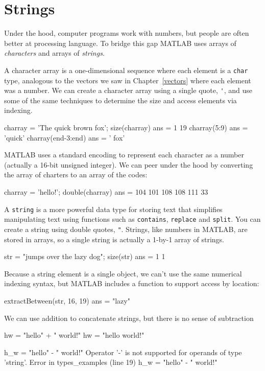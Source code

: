 \section{Strings}

Under the hood, computer programs work with numbers, but people are often better at processing language.  To bridge this gap MATLAB uses arrays of \emph{characters} and arrays of \emph{strings}.

A character array is a one-dimensional sequence where each element is a \lstinline{char} type, analogous to the vectors we saw in Chapter~\ref{vectors} where each element was a number.   We can create a character array using a single quote, \lstinline{'}, and use some of the same techniques to determine the size and access elements via indexing.

\begin{code}
    charray = 'The quick brown fox';
    size(charray)
    ans =
         1    19
    charray(5:9)
    ans =
        'quick'
    charray(end-3:end)
    ans =
        ' fox'
\end{code}   

MATLAB uses a standard encoding to represent each character as a number (actually a 16-bit unsigned integer).  We can peer under the hood by converting the array of charters to an array of the codes:
\begin{code}
charray = 'hello!';
double(charray)
ans =
   104   101   108   108   111    33
\end{code}

A \lstinline{string} is a more powerful data type for storing text that simplifies manipulating text using functions such as \lstinline{contains}, \lstinline{replace} and \lstinline{split}.  You can create a string using double quotes, \lstinline{"}.  Strings, like numbers in MATLAB, are stored in arrays, so a single string is actually a 1-by-1 array of strings.

\begin{code}
str = "jumps over the lazy dog";
size(str)
ans =
     1     1
\end{code}
Because a string element is a single object, we can't use the same numerical indexing syntax, but MATLAB includes a function to support access by location:
\begin{code}
extractBetween(str, 16, 19)
ans = 
    "lazy"
\end{code}
We can use addition to concatenate strings, but there is no sense of subtraction
\begin{code}
hw = "hello" + " world!"
hw = 
    "hello world!"

h_w = "hello" - " world!"
Operator '-' is not supported for operands of type 'string'.
Error in types_examples (line 19)
h_w = "hello" - " world!"
\end{code}


